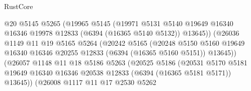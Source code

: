 \begin{lexlean}{RustCore}
\begin{coremodule}
                                  @20
                                  @5145
                                  @5265
                                  (@19965
                                    @5145
                                    (@19971
                                      @5131
                                      @5140
                                      @19649
                                      @16340
                                      @16346
                                      @19978
                                      @12833
                                      (@6394 (@16365 @5140 @5132))
                                      @13645))
                                  (@26036
                                    @1149
                                    @11
                                    @19
                                    @5165
                                    @5264
                                    (@20242
                                      @5165
                                      (@20248
                                        @5150
                                        @5160
                                        @19649
                                        @16340
                                        @16346
                                        @20255
                                        @12833
                                        (@6394 (@16365 @5160 @5151))
                                        @13645))
                                    (@26057
                                      @1148
                                      @11
                                      @18
                                      @5186
                                      @5263
                                      (@20525
                                        @5186
                                        (@20531
                                          @5170
                                          @5181
                                          @19649
                                          @16340
                                          @16346
                                          @20538
                                          @12833
                                          (@6394 (@16365 @5181 @5171))
                                          @13645))
                                      (@26008
                                        @1117
                                        @11
                                        @17
                                        @2530
                                        @5262

\end{coremodule}
\end{lexlean}
